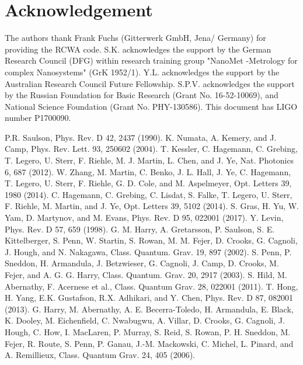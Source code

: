 \documentclass[twocolumn,secnumarabic,amssymb, nobibnotes, aps, prd, showpacs]{revtex4-1}
\begin{document}
\section*{Acknowledgement}
\noindent The authors thank Frank Fuchs (Gitterwerk GmbH, Jena/ Germany) for providing the RCWA code.
S.K. acknowledges the support by the German Research Council (DFG) within research training group "NanoMet -Metrology for complex Nanosystems" (GrK 1952/1).
Y.L. acknowledges the support by the Australian Research Council Future Fellowship.
S.P.V. acknowledges the support by the Russian Foundation for Basic Research (Grant No. 16-52-10069), and National Science Foundation (Grant No. PHY-130586).
This document has LIGO number P1700090.

%
\begin{thebibliography}{99}
P.R. Saulson, Phys. Rev. D 42, 2437 (1990).
K. Numata, A. Kemery, and J. Camp, Phys. Rev. Lett. 93, 250602 (2004).
T. Kessler, C. Hagemann, C. Grebing, T. Legero, U. Sterr, F. Riehle, M. J. Martin, L. Chen, and J. Ye, Nat. Photonics 6, 687 (2012).
W. Zhang, M. Martin, C. Benko, J. L. Hall, J. Ye, C. Hagemann, T. Legero, U. Sterr, F. Riehle, G. D. Cole, and M. Aspelmeyer, Opt. Letters 39, 1980 (2014).
C. Hagemann, C. Grebing, C. Lisdat, S. Falke, T. Legero, U. Sterr, F. Riehle, M. Martin, and J. Ye, Opt. Letters 39, 5102 (2014).
S. Gras, H. Yu, W. Yam, D. Martynov, and M. Evans, Phys. Rev. D 95, 022001 (2017).
Y. Levin, Phys. Rev. D 57, 659 (1998).
G. M. Harry, A. Gretarsson, P. Saulson, S. E. Kittelberger, S. Penn, W. Startin, S. Rowan, M. M. Fejer, D. Crooks, G. Cagnoli, J. Hough, and N. Nakagawa, Class. Quantum. Grav. 19, 897 (2002).
S. Penn, P. Sneddon, H. Armandula, J. Betzwieser, G. Cagnoli, J. Camp, D. Crooks, M. Fejer, and A. G. G. Harry, Class. Quantum. Grav. 20, 2917 (2003).
S. Hild, M. Abernathy, F. Acernese et al., Class. Quantum Grav. 28, 022001 (2011).
T. Hong, H. Yang, E.K. Gustafson, R.X. Adhikari, and Y. Chen, Phys. Rev. D 87, 082001 (2013).
G. Harry, M. Abernathy, A. E. Becerra-Toledo, H. Armandula, E. Black, K. Dooley, M. Eichenfield, C. Nwabugwu, A. Villar, D. Crooks, G. Cagnoli, J. Hough, C. How, I. MacLaren, P. Murray, S. Reid, S. Rowan, P. H. Sneddon, M. Fejer, R. Route, S. Penn, P. Ganau, J.-M. Mackowski, C. Michel, L. Pinard, and A. Remillieux, Class. Quantum Grav. 24, 405 (2006).

\end{thebibliography}
\end{document}
